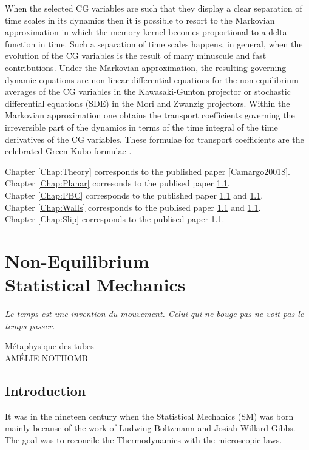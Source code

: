 \documentclass[b5paper,openright,11pt]{book}
\begin{document}
When the  selected CG  variables are  such that  they display  a clear
separation  of time  scales in  its dynamics  then it  is possible  to
resort  to the  Markovian  approximation in  which  the memory  kernel
becomes proportional to  a delta function in time.   Such a separation
of  time scales  happens, in  general, when  the evolution  of the  CG
variables  is the  result of  many minuscule  and fast  contributions.
Under  the Markovian  approximation, the  resulting governing  dynamic
equations    are   non-linear    differential   equations    for   the
non-equilibrium averages  of the  CG variables in  the Kawasaki-Gunton
projector or stochastic  differential equations (SDE) in  the Mori and
Zwanzig projectors.   Within the  Markovian approximation  one obtains
the  transport coefficients  governing  the irreversible  part of  the
dynamics in terms of the time  integral of the time derivatives of the
CG  variables.   These formulae  for  transport  coefficients are  the
celebrated Green-Kubo formulae \cite{Green1952,Kubo1957}.


Chapter \ref{Chap:Theory} corresponds to the published paper \ref{Camargo20018}.\\
Chapter \ref{Chap:Planar} corresonds to the publised paper \ref{}.\\
Chapter \ref{Chap:PBC} corresponds to the published paper \ref{} and \ref{}.\\
Chapter \ref{Chap:Walls} corresponds to the publised paper \ref{} and \ref{}.\\
Chapter \ref{Chap:Slip} corresponds to the publised paper \ref{}.\\


\chapter{Non-Equilibrium \\ Statistical Mechanics}
\label{Chap:NESM}
\epigraph{\textit{Le temps est une invention du mouvement. Celui qui ne bouge pas ne voit pas le temps passer.}}{Métaphysique des tubes \\ AMÉLIE NOTHOMB}

\section{Introduction}
It was in the nineteen century when the Statistical Mechanics (SM) was born mainly because of the work of Ludwing Boltzmann and Josiah Willard Gibbs. The goal was to reconcile the Thermodynamics with the microscopic laws. 
\end{document}
